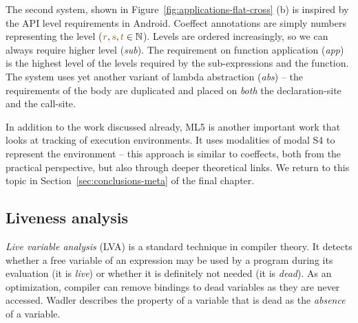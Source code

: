 The second system, shown in Figure~\ref{fig:applications-flat-cross} (b) is inspired by the API
level requirements in Android. Coeffect annotations are simply numbers representing the level
($\aclrd{r}, \aclrd{s}, \aclrd{t} \in \mathbb{N}$). Levels are ordered increasingly, so we can
always require higher level (\emph{sub}). The requirement on function application (\emph{app}) is
the highest level of the levels required by the sub-expressions and the function. The system uses 
yet another variant of lambda abstraction (\emph{abs}) -- the requirements of the body are duplicated
and placed on \emph{both} the declaration-site and the call-site.

In addition to the work discussed already, ML5 \cite{app-distributed-ml5} is another important work 
that looks at tracking of execution environments. It uses modalities of modal S4 to represent the 
environment -- this approach is similar to coeffects, both from the practical perspective, but also 
through deeper theoretical links. We return to this topic in Section~\ref{sec:conclusions-meta} of
the final chapter.


\subsection{Liveness analysis}
\label{sec:applications-flat-live}

\emph{Live variable analysis} (LVA) \cite{app-modern-compiler} is a standard technique in compiler 
theory. It detects whether a free variable of an expression may be used by a program during its
evaluation (it is \emph{live}) or whether it is definitely not needed (it is \emph{dead}). As an 
optimization, compiler can remove bindings to dead variables as they are never accessed. Wadler 
\cite{app-strictness-absecnce} describes the property of a variable that is dead as the 
\emph{absence} of a variable. 


